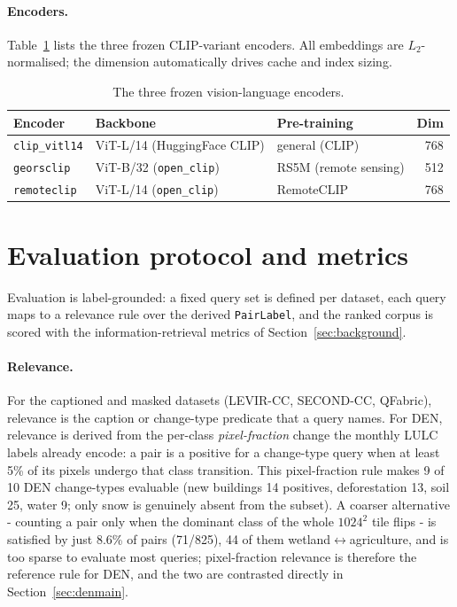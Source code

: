 \documentclass{article}
\begin{document}
\paragraph{Encoders.}
Table~\ref{tab:encoders} lists the three frozen CLIP-variant encoders. All
embeddings are $L_2$-normalised; the dimension automatically drives cache and
index sizing.

\begin{table}[H]
    \centering
    \caption{The three frozen vision-language encoders.}
    \label{tab:encoders}
    \begin{tabular}{lllr}
        \toprule
        \textbf{Encoder} & \textbf{Backbone} & \textbf{Pre-training} & \textbf{Dim} \\
        \midrule
        \texttt{clip\_vitl14} & ViT-L/14 (HuggingFace CLIP)        & general (CLIP)       & 768 \\
        \texttt{georsclip}    & ViT-B/32 (\texttt{open\_clip})     & RS5M (remote sensing) & 512 \\
        \texttt{remoteclip}   & ViT-L/14 (\texttt{open\_clip})     & RemoteCLIP            & 768 \\
        \bottomrule
    \end{tabular}
\end{table}


\section{Evaluation protocol and metrics}
\label{sec:eval}

Evaluation is label-grounded: a fixed query set is defined per dataset, each
query maps to a relevance rule over the derived \texttt{PairLabel}, and the
ranked corpus is scored with the information-retrieval metrics of
Section~\ref{sec:background}.

\paragraph{Relevance.}
For the captioned and masked datasets (LEVIR-CC, SECOND-CC, QFabric), relevance
is the caption or change-type predicate that a query names. For DEN, relevance is
derived from the per-class \emph{pixel-fraction} change the monthly LULC labels
already encode: a pair is a positive for a change-type query when at least 5\% of
its pixels undergo that class transition. This pixel-fraction rule makes 9 of 10
DEN change-types evaluable (new buildings 14 positives, deforestation 13, soil
25, water 9; only snow is genuinely absent from the subset). A coarser
alternative - counting a pair only when the dominant class of the whole
$1024^2$ tile flips - is satisfied by just 8.6\% of pairs (71/825), 44 of them
wetland$\leftrightarrow$agriculture, and is too sparse to evaluate most queries;
pixel-fraction relevance is therefore the reference rule for DEN, and the two are
contrasted directly in Section~\ref{sec:denmain}.
\end{document}
